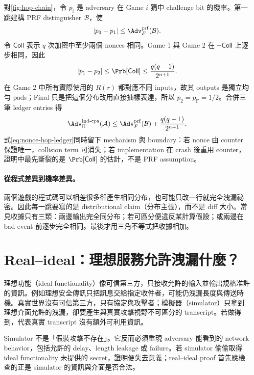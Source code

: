 \documentclass[11pt,a4paper,oneside,openany]{book}
\begin{document}
對\cref{fig:hop-chain}，令 $p_i$ 是 adversary 在 Game $i$ 猜中 challenge bit 的機率。第一跳建構 PRF distinguisher $\mathcal B$，使
\[
 |p_0-p_1|\le \Adv_F^{\mathrm{prf}}(\mathcal B).
\]
令 $\mathsf{Coll}$ 表示 $q$ 次加密中至少兩個 nonces 相同。Game 1 與 Game 2 在 $\neg\mathsf{Coll}$ 上逐步相同，因此
\[
 |p_1-p_2|\le\Prb[\mathsf{Coll}]
 \le\frac{q(q-1)}{2^{n+1}}.
\]
在 Game 2 中所有實際使用的 $R(r)$ 都對應不同 inputs，故其 outputs 是獨立均勻 pads；Final 只是把這個分布改用直接抽樣表達，所以 $p_2=p_{\mathrm F}=1/2$。合併三筆 ledger entries 得
\begin{equation}
 \Adv_{\Pi}^{\mathrm{ind\text{-}cpa}}(\mathcal A)
 \le
 \Adv_F^{\mathrm{prf}}(\mathcal B)
 +\frac{q(q-1)}{2^{n+1}}.
 \label{eq:nonce-hop-ledger}
\end{equation}
式\eqref{eq:nonce-hop-ledger}同時留下 mechanism 與 boundary：若 nonce 由 counter 保證唯一，collision term 可消失；若 implementation 在 crash 後重用 counter，證明中最先斷裂的是 $\Prb[\mathsf{Coll}]$ 的估計，不是 PRF assumption。

\paragraph{從程式差異到機率差異。}
兩個遊戲的程式碼可以相差很多卻產生相同分布，也可能只改一行就完全洩漏祕密。因此每一跳要寫的是 distributional claim（分布主張），而不是 diff 大小。常見收據只有三類：兩邊輸出完全同分布；若可區分便違反某計算假設；或兩邊在 bad event 前逐步完全相同。最後才用三角不等式把收據相加。

\section{Real--ideal：理想服務允許洩漏什麼？}
理想功能（ideal functionality）像可信第三方，只接收允許的輸入並輸出規格准許的資訊。例如理想安全傳訊只把訊息交給指定收件者，可能仍洩漏長度與傳送時機。真實世界沒有可信第三方，只有協定與攻擊者；模擬器（simulator）只拿到理想介面允許的洩漏，卻要產生與真實攻擊視野不可區分的 transcript。若做得到，代表真實 transcript 沒有額外可利用資訊。

Simulator 不是「假裝攻擊不存在」。它反而必須重現 adversary 能看到的 network behavior，包括允許的 delay、length leakage 或 failure。若 simulator 偷偷取得 ideal functionality 未提供的 secret，證明便失去意義；real--ideal proof 首先應檢查的正是 simulator 的資訊與介面是否合法。
\end{document}
